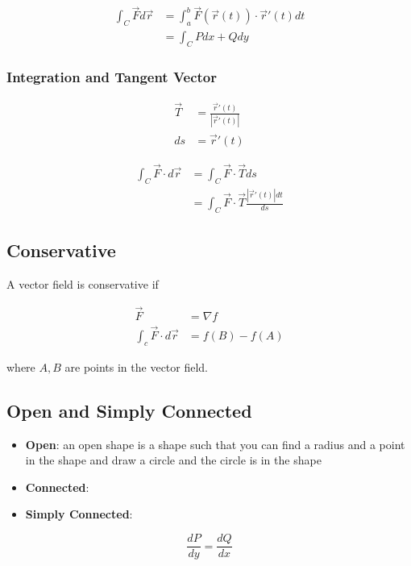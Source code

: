     \begin{align}
      \int_{C} \vec{F} d\vec{r}
        &= \int_{a}^{b} \vec{F}\left( \vec{r} \left( t \right) \right)
        \cdot \vec{r}'\left( t \right) dt \\
        &= \int_{C} P dx + Q dy
    \end{align}

    \subsubsection{Integration and Tangent Vector}

      \begin{align*}
        \vec{T} &= \frac{\vec{r}'\left( t \right)}{\left| \vec{r}'\left( t \right) \right|} \\
        ds &= \vec{r}'\left( t \right)
      \end{align*}

      \begin{align*}
        \int_{C} \vec{F} \cdot d \vec{r}
        &= \int_{C} \vec{F} \cdot \vec{T} ds \\
        &= \int_{C} \vec{F} \cdot \vec{T} \frac{\left| \vec{r}'\left( t \right) \right| dt}{ds}
      \end{align*}

  \subsection{Conservative}

    A vector field is conservative if

    \begin{align}
      \vec{F} &= \nabla f \\
      \int_{c} \vec{F} \cdot d \vec{r} &= f\left( B \right) - f\left( A \right)
    \end{align}

    where $ A, B $ are points in the vector field.

  \subsection{Open and Simply Connected}

    \begin{itemize}
      \item \textbf{Open}: an open shape is a shape such that you
      can find a radius and a point in the shape and draw a circle
      and the circle is in the shape
      \item \textbf{Connected}:
      \item \textbf{Simply Connected}:
    \end{itemize}

    \begin{equation}
      \frac{dP}{dy} = \frac{dQ}{dx}
    \end{equation}